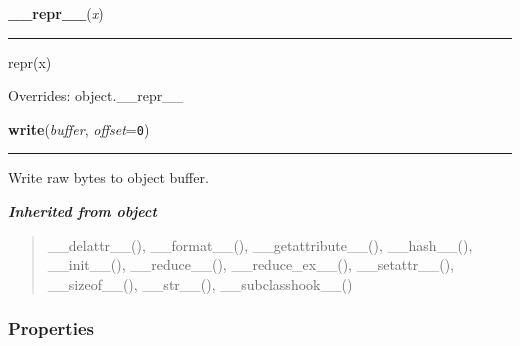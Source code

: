     \vspace{0.5ex}

\hspace{.8\funcindent}\begin{boxedminipage}{\funcwidth}

    \raggedright \textbf{\_\_repr\_\_}(\textit{x})

    \vspace{-1.5ex}

    \rule{\textwidth}{0.5\fboxrule}
\setlength{\parskip}{2ex}
    repr(x)

\setlength{\parskip}{1ex}
      Overrides: object.\_\_repr\_\_

    \end{boxedminipage}

    \label{pygame:BufferProxy:write}

    \vspace{0.5ex}

\hspace{.8\funcindent}\begin{boxedminipage}{\funcwidth}

    \raggedright \textbf{write}(\textit{buffer}, \textit{offset}={\tt 0})

    \vspace{-1.5ex}

    \rule{\textwidth}{0.5\fboxrule}
\setlength{\parskip}{2ex}
    Write raw bytes to object buffer.

\setlength{\parskip}{1ex}
    \end{boxedminipage}


\large{\textbf{\textit{Inherited from object}}}

\begin{quote}
\_\_delattr\_\_(), \_\_format\_\_(), \_\_getattribute\_\_(), \_\_hash\_\_(), \_\_init\_\_(), \_\_reduce\_\_(), \_\_reduce\_ex\_\_(), \_\_setattr\_\_(), \_\_sizeof\_\_(), \_\_str\_\_(), \_\_subclasshook\_\_()
\end{quote}


  \subsubsection{Properties}

